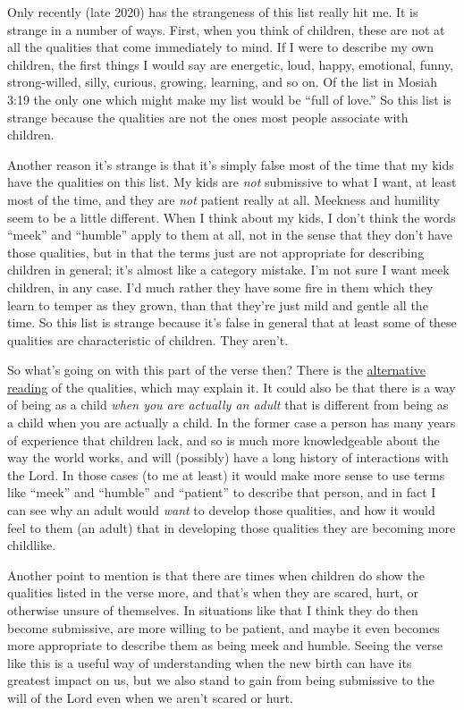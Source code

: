			Only recently (late 2020) has the strangeness of this list really hit me. It is strange in a number of ways. First, when you think of children, these are not at all the qualities that come immediately to mind. If I were to describe my own children, the first things I would say are energetic, loud, happy, emotional, funny, strong-willed, silly, curious, growing, learning, and so on. Of the list in Mosiah 3:19 the only one which might make my list would be ``full of love.'' So this list is strange because the qualities are not the ones most people associate with children.
			
			Another reason it's strange is that it's simply false most of the time that my kids have the qualities on this list. My kids are \textit{not} submissive to what I want, at least most of the time, and they are \textit{not} patient really at all. Meekness and humility seem to be a little different. When I think about my kids, I don't think the words ``meek'' and ``humble'' apply to them at all, not in the sense that they don't have those qualities, but in that the terms just are not appropriate for describing children in general; it's almost like a category mistake. I'm not sure I want meek children, in any case. I'd much rather they have some fire in them which they learn to temper as they grown, than that they're just mild and gentle all the time. So this list is strange because it's false in general that at least some of these qualities are characteristic of children. They aren't.
			
			So what's going on with this part of the verse then? There is the \hyperref[MOSIAH-3-19-NOTE-child]{alternative reading} of the qualities, which may explain it. It could also be that there is a way of being as a child \textit{when you are actually an adult} that is different from being as a child when you are actually a child. In the former case a person has many years of experience that children lack, and so is much more knowledgeable about the way the world works, and will (possibly) have a long history of interactions with the Lord. In those cases (to me at least) it would make more sense to use terms like ``meek'' and ``humble'' and ``patient'' to describe that person, and in fact I can see why an adult would \textit{want} to develop those qualities, and how it would feel to them (an adult) that in developing those qualities they are becoming more childlike.
			
			Another point to mention is that there are times when children do show the qualities listed in the verse more, and that's when they are scared, hurt, or otherwise unsure of themselves. In situations like that I think they do then become submissive, are more willing to be patient, and maybe it even becomes more appropriate to describe them as being meek and humble. Seeing the verse like this is a useful way of understanding when the new birth can have its greatest impact on us, but we also stand to gain from being submissive to the will of the Lord even when we aren't scared or hurt.
			
